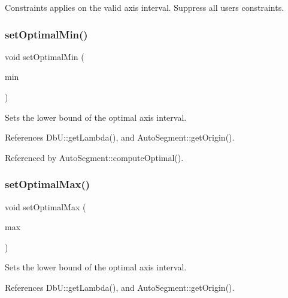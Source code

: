 Constraints applies on the valid axis interval. Suppress all user\textquotesingle{}s constraints. \mbox{\label{classKatabatic_1_1AutoSegment_af92b3d000552b630695879dd5d4736a1}} 
\subsubsection{\texorpdfstring{set\+Optimal\+Min()}{setOptimalMin()}}
{\footnotesize\ttfamily void set\+Optimal\+Min (\begin{DoxyParamCaption}\item[{\textbf{ Db\+U\+::\+Unit}}]{min }\end{DoxyParamCaption})\hspace{0.3cm}{\ttfamily [inline]}}

Sets the lower bound of the optimal axis interval. 

References Db\+U\+::get\+Lambda(), and Auto\+Segment\+::get\+Origin().



Referenced by Auto\+Segment\+::compute\+Optimal().

\mbox{\label{classKatabatic_1_1AutoSegment_a90173ab4f35b98c6544f9482ccd93b5e}} 
\subsubsection{\texorpdfstring{set\+Optimal\+Max()}{setOptimalMax()}}
{\footnotesize\ttfamily void set\+Optimal\+Max (\begin{DoxyParamCaption}\item[{\textbf{ Db\+U\+::\+Unit}}]{max }\end{DoxyParamCaption})\hspace{0.3cm}{\ttfamily [inline]}}

Sets the lower bound of the optimal axis interval. 

References Db\+U\+::get\+Lambda(), and Auto\+Segment\+::get\+Origin().



